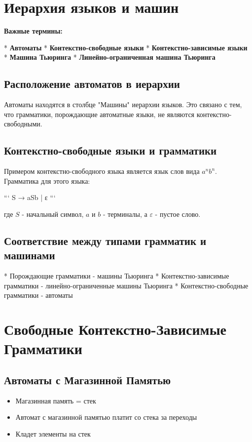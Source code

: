 \documentclass{article}
\begin{document}
\begin{itemize}
\begin{itemize}
\section{Иерархия языков и машин}

\textbf{Важные термины:}

* \textbf{Автоматы}
* \textbf{Контекстно-свободные языки}
* \textbf{Контекстно-зависимые языки}
* \textbf{Машина Тьюринга}
* \textbf{Линейно-ограниченная машина Тьюринга}

\subsection{Расположение автоматов в иерархии}

Автоматы находятся в столбце "Машины" иерархии языков. Это связано с тем, что грамматики, порождающие автоматные языки, не являются контекстно-свободными.

\subsection{Контекстно-свободные языки и грамматики}

Примером контекстно-свободного языка является язык слов вида $a^nb^n$. Грамматика для этого языка:

```
S → aSb | ε
```

где $S$ - начальный символ, $a$ и $b$ - терминалы, а $\varepsilon$ - пустое слово.

\subsection{Соответствие между типами грамматик и машинами}

* Порождающие грамматики - машины Тьюринга
* Контекстно-зависимые грамматики - линейно-ограниченные машины Тьюринга
* Контекстно-свободные грамматики - автоматы
\section{Свободные Контекстно-Зависимые Грамматики}

\subsection{Автоматы с Магазинной Памятью}
\begin{itemize}
\item Магазинная память = стек
\item Автомат с магазинной памятью платит со стека за переходы
\item Кладет элементы на стек
\end{itemize}


\end{itemize}
\end{itemize}
\end{document}
